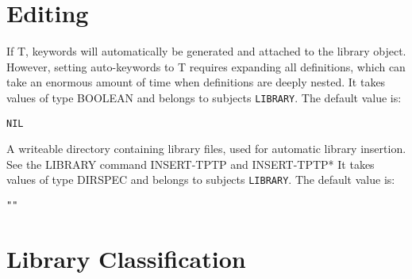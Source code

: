 \section{Editing}

\begin{description} 
\item[AUTO-KEYWORDS]  
If T, keywords will automatically be generated and attached to the library object.
However, setting auto-keywords to T requires expanding all definitions, 
which can take an enormous amount of time when definitions are deeply nested.
It takes values of type BOOLEAN and belongs to subjects \texttt{LIBRARY}.  The default value is: \begin{lstlisting}
NIL
\end{lstlisting}

\item[AUTO-LIB-DIR]  
A writeable directory containing 
library files, used for automatic library insertion.
See the LIBRARY command INSERT-TPTP and INSERT-TPTP*
It takes values of type DIRSPEC and belongs to subjects \texttt{LIBRARY}.  The default value is: \begin{lstlisting}
""
\end{lstlisting}

\item
\end{description}

\section{Library Classification}

